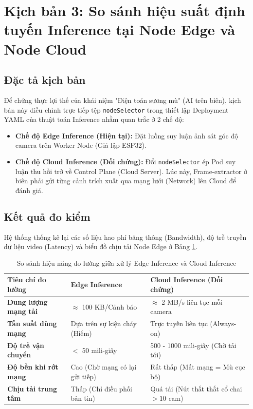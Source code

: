 \documentclass[12pt,a4paper]{report}
\begin{document}
\section{Kịch bản 3: So sánh hiệu suất định tuyến Inference tại Node Edge và Node Cloud}

\subsection{Đặc tả kịch bản}
Để chứng thực lợi thế của khái niệm "Điện toán sương mù" (AI trên biên), kịch bản này điều chỉnh trực tiếp tệp \texttt{nodeSelector} trong thiết lập Deployment YAML của thuật toán Inference nhằm quan trắc ở 2 chế độ:
\begin{itemize}
    \item \textbf{Chế độ Edge Inference (Hiện tại):} Đặt luồng suy luận ảnh sát góc độ camera trên Worker Node (Giả lập ESP32).
    \item \textbf{Chế độ Cloud Inference (Đối chứng):} Đổi \texttt{nodeSelector} ép Pod suy luận thu hồi trở về Control Plane (Cloud Server). Lúc này, Frame-extractor ở biên phải gửi từng cảnh trích xuất qua mạng lưới (Network) lên Cloud để đánh giá.
\end{itemize}

\subsection{Kết quả đo kiểm}

Hệ thống thống kê lại các số liệu hao phí băng thông (Bandwidth), độ trễ truyền dữ liệu video (Latency) và biểu đồ chịu tải Node Edge ở Bảng \ref{tab:edge_vs_cloud}.

\begin{table}[H]
  \centering
  \caption{So sánh hiệu năng đo lường giữa xử lý Edge Inference và Cloud Inference}
  \label{tab:edge_vs_cloud}
  \begin{tabular}{p{4.5cm} p{4.5cm} p{5.5cm}}
    \toprule
    \textbf{Tiêu chí đo lường} & \textbf{Edge Inference} & \textbf{Cloud Inference (Đối chứng)} \\
    \midrule
    \textbf{Dung lượng mạng tải} & $\approx$ 100 KB/Cảnh báo & $\approx$ 2 MB/s liên tục mỗi camera \\
    \textbf{Tần suất dùng mạng} & Dựa trên sự kiện cháy (Hiếm) & Trực tuyến liên tục (Always-on) \\
    \textbf{Độ trễ vận chuyển} & $<$ 50 mili-giây & 500 - 1000 mili-giây (Chờ tải tới) \\
    \textbf{Độ bền khi rớt mạng} & Cao (Chờ mạng có lại gửi tiếp) & Rất thấp (Mất mạng = Mù cục bộ) \\
    \textbf{Chịu tải trung tâm} & Thấp (Chỉ điều phối bản tin) & Quá tải (Nút thắt thắt cổ chai $>10$ cam) \\
    \bottomrule
  \end{tabular}
\end{table}
\end{document}

